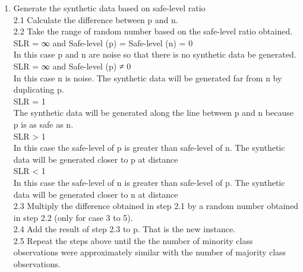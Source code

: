 \begin{enumerate}
\item{Generate the synthetic data based on safe-level ratio  \\
         2.1 Calculate the difference between p and n.  \\
         2.2 Take the range of random number based on the safe-level ratio obtained.  \\
                        SLR = ∞ and Safe-level (p) = Safe-level (n) = 0  \\
                            In this case p and n are noise so that there is no synthetic data be generated.  \\
                        SLR = ∞ and Safe-level (p) ≠ 0  \\
                            In this case n is noise. The synthetic data will be generated far from n by duplicating p.  \\
                        SLR = 1  \\
                            The synthetic data will be generated along the line between p and n because p is as safe as n.  \\
                        SLR > 1  \\
                            In this case the safe-level of p is greater than safe-level of n. The synthetic data will be generated closer to p at distance  \\
                        SLR < 1  \\
                            In this case the safe-level of n is greater than safe-level of p. The synthetic data will be generated closer to n at distance  \\
       2.3 Multiply the difference obtained in step 2.1 by a random number obtained in step 2.2 (only for case 3 to 5).\\ 
       2.4 Add the result of step 2.3 to p. That is the new instance.  \\
       2.5 Repeat the steps above until the the number of minority class observations were approximately similar with the number of majority class observations.  \\}
\end{enumerate}
